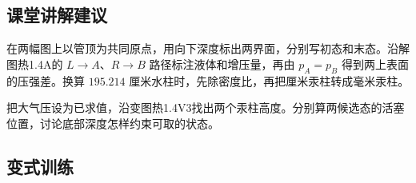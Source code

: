 \documentclass[UTF8,fontset=fandol,a4paper,11pt]{ctexart}
\begin{document}

\subsection*{课堂讲解建议}

在两幅图上以管顶为共同原点，用向下深度标出两界面，分别写初态和末态。沿解图热1.4A的 $L\to A$、$R\to B$ 路径标注液体和增压量，再由 $p_A=p_B$ 得到两上表面的压强差。换算 $195.214$ 厘米水柱时，先除密度比，再把厘米汞柱转成毫米汞柱。

把大气压设为已求值，沿变图热1.4V3找出两个汞柱高度。分别算两候选态的活塞位置，讨论底部深度怎样约束可取的状态。




\subsection*{变式训练}
\end{document}
